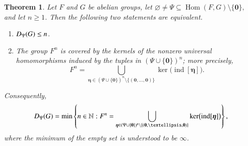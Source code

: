 \documentclass[10pt,a4paper]{amsart}
\newtheorem{theorem}{Theorem}[section]
\begin{document}
\begin{theorem}\label{thm:kernel-cover}
Let $F$ and $G$ be abelian groups, let
$\varnothing\neq\Psi\subseteq\operatorname{Hom}(F,G)\setminus\{\mathbf 0\},$
and let $n\ge 1$. Then the following two statements are equivalent.
\begin{enumerate}
  \item[\rm (i)] ${\rm D}_{\Psi}(G)\le n$.

  \item[\rm (ii)] The group $F^n$ is covered by the kernels of the
  nonzero universal homomorphisms induced by the tuples in
  $(\Psi\cup\{\mathbf 0\})^n$; more precisely,
  $$F^n=\bigcup_{\boldsymbol{\eta}\in
      (\Psi\cup\{\mathbf 0\})^n\setminus\{(\mathbf 0,\ldots,\mathbf 0)\}}
    \ker\bigl(\operatorname{ind}[\boldsymbol{\eta}]\bigr).$$
\end{enumerate}

Consequently,
\begin{equation}\label{eq:D-minimum}
 {\rm D}_{\Psi}(G)
 =
 \min\left\{
 n\in\mathbb N:
 F^n
 =
 \bigcup_{\boldsymbol{\eta}\in
   (\Psi\cup\{\mathbf 0\})^n\setminus
   \{(\mathbf 0,\ldots,\mathbf 0)\}}
 \ker\bigl(\operatorname{ind}[\boldsymbol{\eta}]\bigr)
 \right\},
\end{equation}
where the minimum of the empty set is understood to be $\infty$.
\end{theorem}
\end{document}
